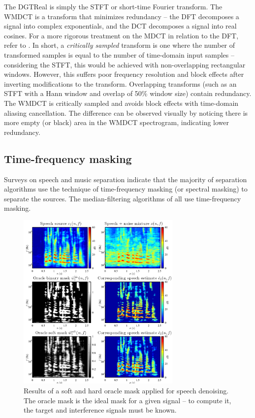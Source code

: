 \documentclass[letter,12pt]{article}
\begin{document}
The DGTReal is simply the STFT or short-time Fourier transform. The WMDCT is a transform that minimizes redundancy -- the DFT decomposes a signal into complex exponentials, and the DCT decomposes a signal into real cosines. For a more rigorous treatment on the MDCT in relation to the DFT, refer to \cite{mdct}. In short, a \textit{critically sampled} transform is one where the number of transformed samples is equal to the number of time-domain input samples -- considering the STFT, this would be achieved with non-overlapping rectangular windows. However, this suffers poor frequency resolution and block effects after inverting modifications to the transform. Overlapping transforms (such as an STFT with a Hann window and overlap of 50\% window size) contain redundancy. The WMDCT is critically sampled and avoids block effects with time-domain aliasing cancellation. The difference can be observed visually by noticing there is more empty (or black) area in the WMDCT spectrogram, indicating lower redundancy.

\clearpage
\vfill

\subsection{Time-frequency masking}

Surveys on speech \cite{speechmask} and music separation \cite{musicmask} indicate that the majority of separation algorithms use the technique of time-frequency masking (or spectral masking) to separate the sources. The median-filtering algorithms of \citet{fitzgerald1, fitzgerald2, driedger} all use time-frequency masking.

\begin{figure}
	\vspace{-1.0em}
	\includegraphics[width=8cm]{./maskdemo.png}
	\caption{Results of a soft and hard oracle mask applied for speech denoising. The oracle mask is the ideal mask for a given signal -- to compute it, the target and interference signals must be known.}
	\label{fig:masks}
	\vspace{-1.5em}
\end{figure}
\end{document}
